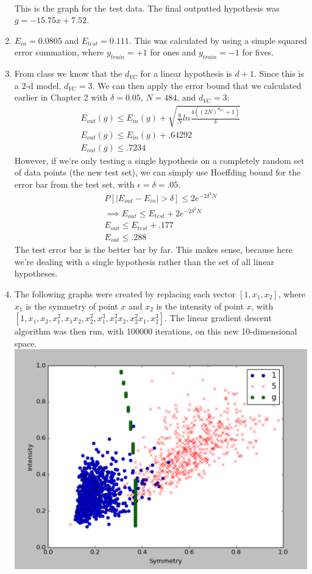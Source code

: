 \documentclass[12pt]{article}
\begin{document}
\begin{enumerate}[label=(\alph*)]
	\\ This is the graph for the test data. The final outputted hypothesis was $g = -15.75x + 7.52$.
	\item $E_{in} = \boldsymbol{0.0805}$ and $E_{test} = \boldsymbol{0.111}$. This was calculated by using a simple squared error summation, where $y_{train} = +1$ for ones and $y_{train} = -1$ for fives.
	\item From class we know that the $d_{VC}$ for a linear hypothesis is $d + 1$. Since this is a 2-d model, $d_{VC} = 3$. We can then apply the error bound that we calculated earlier in Chapter 2 with $\delta = 0.05$, $N = 484$, and $d_{VC} = 3$:
	\begin{gather*}
		E_{out}(g) \le E_{in}(g) + \sqrt{\frac{8}{N} ln \frac{4((2N)^{d_{VC}} + 1)}{\delta}}
		\\ E_{out}(g) \le E_{in}(g) + .64292
		\\ E_{out}(g) \le \boldsymbol{.7234}
 	\end{gather*}
 	However, if we're only testing a single hypothesis on a completely random set of data points (the new test set), we can simply use Hoeffding bound for the error bar from the test set, with $\epsilon = \delta = .05$.
 	\begin{gather*}
	 	P[|E_{out} - E_{in}| > \delta] \le 2e^{-2\delta^2N}
	 	\\ \implies E_{out} \le E_{test} + 2e^{-2\delta^2N}
	 	\\ E_{out} \le E_{test} + .177
	 	\\ E_{out} \le \boldsymbol{.288}
 	\end{gather*}
 	The test error bar is the better bar by far. This makes sense, because here we're dealing with a single hypothesis rather than the set of all linear hypotheses.
 	\item The following graphs were created by replacing each vector $[1, x_1, x_2]$, where $x_1$ is the symmetry of point $x$ and $x_2$ is the intensity of point $x$, with $[1, x_1, x_2, x_1^2, x_1x_2, x_2^2, x_1^3, x_1^2x_2, x_2^2x_1, x_2^3]$. The linear gradient descent algorithm was then run, with 100000 iterations, on this new 10-dimensional space.
 	\\ \includegraphics[scale=.5]{1-4b.png}

\end{enumerate}
\end{document}
